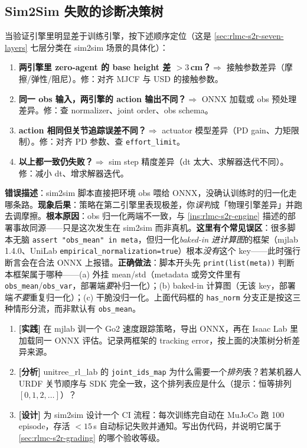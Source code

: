 \subsection{Sim2Sim 失败的诊断决策树}
\label{sec:rlmc-s2r-sim2sim-debug}

当验证引擎里明显差于训练引擎，按下述顺序定位（这是 \cref{sec:rlmc-s2r-seven-layers} 七层分类在 sim2sim 场景的具体化）：

\begin{enumerate}
  \item \textbf{两引擎里 zero-agent 的 base height 差 $>3$\,cm？}$\Rightarrow$ 接触参数差异（摩擦/弹性/阻尼）。修：对齐 MJCF 与 USD 的接触参数。
  \item \textbf{同一 obs 输入，两引擎的 action 输出不同？}$\Rightarrow$ ONNX 加载或 obs 预处理差异。修：查 normalizer、joint order、obs schema。
  \item \textbf{action 相同但关节追踪误差不同？}$\Rightarrow$ actuator 模型差异（PD gain、力矩限制）。修：对齐 PD 参数、查 \verb|effort_limit|。
  \item \textbf{以上都一致仍失败？}$\Rightarrow$ sim step 精度差异（dt 太大、求解器迭代不同）。修：减小 dt、增求解器迭代。
\end{enumerate}

\begin{pitfall}
\textbf{错误描述}：sim2sim 脚本直接把环境 obs 喂给 ONNX，没确认训练时的归一化走哪条路。\textbf{现象后果}：策略在第二引擎里表现极差，你\emph{误判}成「物理引擎差异」并跑去调摩擦。\textbf{根本原因}：obs 归一化两端不一致，与 \cref{ins:rlmc-s2r-engine} 描述的部署事故同源——只是这次发生在 sim2sim 而非真机。\textbf{这里有个常见误区}：很多脚本无脑 \verb|assert "obs_mean" in meta|，但归一化\emph{baked-in 进计算图}的框架（mjlab 1.4.0、UniLab \verb|empirical_normalization=true|）根本\emph{没有}这个 key——此时强行断言会在合法 ONNX 上报错。\textbf{正确做法}：脚本开头先 \verb|print(list(meta))| 判断本框架属于哪种——(a) 外挂 mean/std（metadata 或旁文件里有 \verb|obs_mean|/\verb|obs_var|，部署端\emph{要}补归一化）；(b) baked-in 计算图（无该 key，部署端\emph{不要}重复归一化）；(c) 干脆没归一化。上面代码框的 \verb|has_norm| 分支正是按这三种情形分流，而非默认有 \verb|obs_mean|。
\end{pitfall}

\begin{practice}
\begin{enumerate}
  \item \textbf{[实践]} 在 mjlab 训一个 Go2 速度跟踪策略，导出 ONNX，再在 Isaac Lab 里加载同一 ONNX 评估。记录两框架的 tracking error，按上面的决策树分析差异来源。
  \item \textbf{[分析]} unitree\_rl\_lab 的 \verb|joint_ids_map| 为什么需要一个\emph{排列}表？若某机器人 URDF 关节顺序与 SDK 完全一致，这个排列表应是什么（提示：恒等排列 $[0,1,2,\dots]$）？
  \item \textbf{[设计]} 为 sim2sim 设计一个 CI 流程：每次训练完自动在 MuJoCo 跑 100 episode，存活 $<15$\,s 自动标记失败并通知。写出伪代码，并说明它属于 \cref{sec:rlmc-s2r-grading} 的哪个验收等级。
\end{enumerate}
\end{practice}

